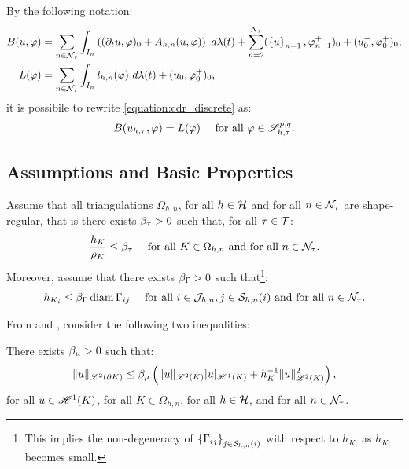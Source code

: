 By the following notation:
\begin{align}
    B(u, \varphi) &= \sum_{n \in \mathcal{N}_{\tau}} \int_{I_n} \left( (\partial_t u, \varphi )_0 + A_{h, n}(u, \varphi) \right) ~ d \lambda(t) + \sum_{n = 2}^{N_{\tau}} (\left\{ u \right\}_{n - 1}, \varphi_{n - 1}^+ )_0 + (u_0^+, \varphi_0^+ )_0, \label{equation:cdr_B} \\
    L(\varphi) &= \sum_{n \in \mathcal{N}_{\tau}} \int_{I_n} l_{h, n}(\varphi) ~ d \lambda(t) + (u_0, \varphi_0^+ )_0 \label{equation:cdr_L},
\end{align}
it is possibile to rewrite \cref{equation:cdr_discrete} as:
\begin{gather}
    B(u_{h, \tau}, \varphi) = L(\varphi) \quad \text{ for all } \varphi \in \mathscr{S}^{p, q}_{h, \tau}. \label{equation:cdr_discrete_short}
\end{gather}

\newpage
\subsection{Assumptions and Basic Properties}

Assume that all triangulations $\Omega_{h, n}$, for all $h \in \mathcal{H}$ and for all $n \in \mathcal{N}_{\tau}$ are shape-regular, that is there exists $\beta_{\tau} > 0$ such that, for all $\tau \in \mathcal{T}$:
\begin{gather}
    \frac{h_K}{\rho_K} \leq \beta_{\tau} \quad \text{ for all } K \in \Omega_{h, n} \text{ and for all } n \in \mathcal{N}_{\tau}.
\end{gather}
Moreover, assume that there exists $\beta_{\Gamma} > 0$ such that\footnote{This implies the non-degeneracy of $\left\{ \Gamma_{ij} \right\}_{j \in \mathcal{S}_{h, n}(i)}$ with respect to $h_{K_i}$ as $h_{K_i}$ becomes small.}:
\begin{gather}
    h_{K_i} \leq \beta_{\Gamma} \operatorname*{diam} \Gamma_{ij} \quad \text{ for all } i \in \mathcal{J}_{h, n}, j \in \mathcal{S}_{h, n}(i) \text{ and for all } n \in \mathcal{N}_{\tau}.
\end{gather}

From \cite{Dolejší2002} and \cite{Ciarlet1978}, consider the following two inequalities:

\begin{lemma}
    There exists $\beta_{\mu} > 0$ such that:
    \begin{gather}
        \lVert u \rVert_{\mathscr{L}^{2}(\partial K)} \leq \beta_{\mu} \left( \lVert u \rVert_{\mathscr{L}^{2}(K)} \lvert u \rvert_{\mathscr{H}^{1}(K)} + h_K^{-1} \lVert u \rVert_{\mathscr{L}^{2}(K)}^2 \right),
    \end{gather}
    for all $u \in \mathscr{H}^{1}(K)$, for all $K \in \Omega_{h, n}$, for all $h \in \mathcal{H}$, and for all $n \in \mathcal{N}_{\tau}$.
\end{lemma}

